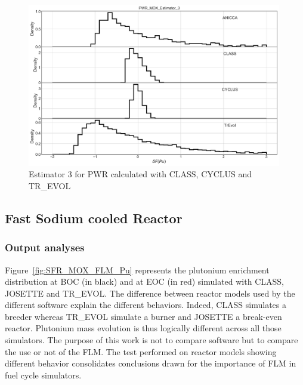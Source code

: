 \begin{figure}[h]
	\begin{center}
		\includegraphics[width = 0.99\textwidth]{../../Feature_1/RAW_DATA/FIG/PWR_MOX_Estimator_3.pdf}
		\caption{Estimator 3 for \gls{PWR} calculated with CLASS, CYCLUS and TR\_EVOL}
		\label{fig:Est3_PWR}
	\end{center}
\end{figure}

\subsection{Fast Sodium cooled Reactor}
\subsubsection{Output analyses}

Figure~\ref{fig:SFR_MOX_FLM_Pu} represents the plutonium enrichment distribution at BOC (in black) and at \gls{EOC} (in red) simulated with CLASS, JOSETTE and TR\_EVOL.
The difference between reactor models used by the different software explain the different behaviors.
Indeed, CLASS simulates a breeder whereas TR\_EVOL simulate a burner and JOSETTE a break-even reactor.
Plutonium mass evolution is thus logically different across all those simulators.
The purpose of this work is not to compare software but to compare the use or not of the \gls{FLM}.
The test performed on reactor models showing different behavior consolidates conclusions drawn for the importance of \gls{FLM} in fuel cycle simulators.

